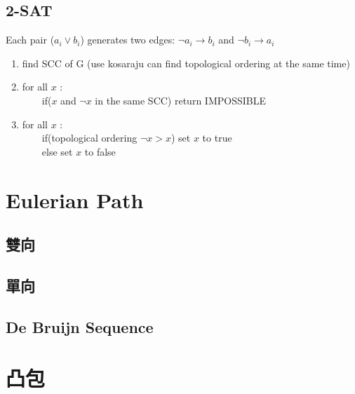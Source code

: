 \documentclass[a4paper]{article}
\begin{document}
\begin{CJK*}{UTF8}{bkai}
    \subsection{2-SAT}
    Each pair ($a_i \lor b_i$) generates two edges: $\lnot a_i \rightarrow b_i$ and $\lnot b_i \rightarrow a_i$
    \begin{enumerate}
        \item find SCC of G (use kosaraju can find topological ordering at the same time)
        \item for all $x$ : \\
        　　if($x$ and $\lnot x$ in the same SCC) return IMPOSSIBLE
        \item for all $x$ :\\
        　　if(topological ordering $\lnot x > x$) set $x$ to true\\
        　　else set $x$ to false
    \end{enumerate}

    \newpage

    \section{Eulerian Path}
    \subsection{雙向}
    
    \subsection{單向}
    
    \subsection{De Bruijn Sequence}
    

    \newpage
    \section{凸包}


\end{CJK*}
\end{document}

